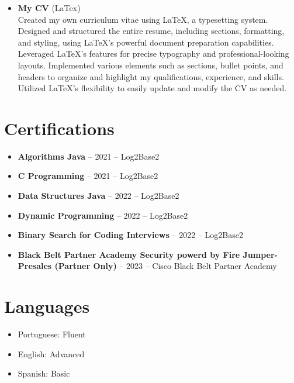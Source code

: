 \documentclass[a4paper,10pt]{article}
\begin{document}
\begin{itemize}[leftmargin=*]
    \item \textbf{My CV} (LaTex) \\
    Created my own curriculum vitae using LaTeX, a typesetting system. Designed and structured the entire resume, including sections, formatting, and styling, using LaTeX's powerful document preparation capabilities. Leveraged LaTeX's features for precise typography and professional-looking layouts. Implemented various elements such as sections, bullet points, and headers to organize and highlight my qualifications, experience, and skills. Utilized LaTeX's flexibility to easily update and modify the CV as needed.    

\end{itemize}

\section*{Certifications}
\begin{itemize}[leftmargin=*]
\item \textbf{Algorithms Java} – 2021 – Log2Base2
\item \textbf{C Programming} – 2021 – Log2Base2
\item \textbf{Data Structures Java} – 2022 – Log2Base2
\item \textbf{Dynamic Programming} – 2022 – Log2Base2
\item \textbf{Binary Search for Coding Interviews} – 2022 – Log2Base2
\item \textbf{Black Belt Partner Academy Security powerd by Fire Jumper-Presales (Partner Only)} – 2023 – Cisco Black Belt Partner Academy
\end{itemize}

\section*{Languages}
\begin{itemize}[leftmargin=*]
    \item Portuguese: Fluent
    \item English: Advanced
    \item Spanish: Basic    
\end{itemize}
\end{document}
